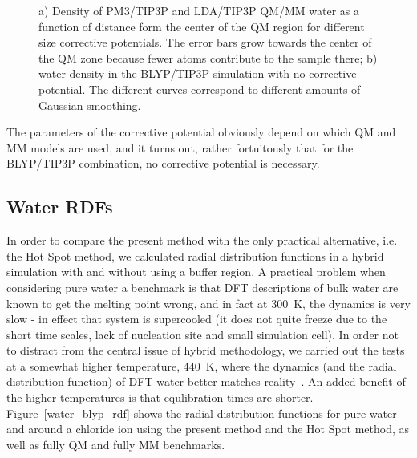 \documentclass[11pt]{revtex4}
\begin{document}
\begin{figure}
\caption{a) Density of PM3/TIP3P and LDA/TIP3P QM/MM water as a function of distance form the center of the QM region for different size corrective potentials. The error bars grow towards the center of the QM zone because fewer atoms contribute to the sample there; b) water density in the BLYP/TIP3P simulation with no corrective potential. The different curves correspond to different amounts of Gaussian smoothing.}
\label{density}
\end{figure}

The parameters of the corrective potential obviously depend on which QM and MM models are used, and it turns out, rather fortuitously that for the BLYP/TIP3P combination, no corrective potential is necessary. 

\subsection{Water RDFs}
In order to compare the present method with the only practical alternative, i.e. the Hot Spot method, we calculated radial distribution functions in a hybrid simulation with and without using a buffer region.  A practical problem when considering pure water a benchmark is that DFT descriptions of bulk water are known to get the melting point wrong, and in fact at 300~K, the dynamics is very slow - in effect that system is supercooled (it does not quite freeze due to the short time scales, lack of nucleation site and small simulation cell). In order not to distract from the central issue of hybrid methodology, we carried out the tests at a somewhat higher temperature, 440~K, where the dynamics (and the radial distribution function) of DFT water better matches reality~\cite{yoo_j_chem_phys_2009a}. An added benefit of the higher temperatures is that equlibration times are shorter. Figure~\ref{water_blyp_rdf} shows the radial distribution functions for pure water and around a chloride ion using the present method and the Hot Spot method, as well as fully QM and fully MM benchmarks.
\end{document}

